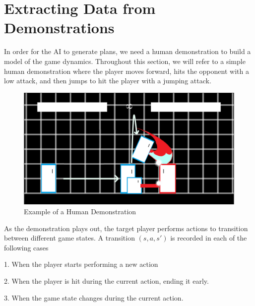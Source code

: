 \section{Extracting Data from Demonstrations}

In order for the AI to generate plans, we need a human demonstration to build a model of the game dynamics. Throughout this section, we will refer to a simple human demonstration where the player moves forward, hits the opponent with a low attack, and then jumps to hit the player with a jumping attack.

\begin{figure}[h]
	\centering
	\includegraphics[scale=0.5]{Figures/Demonstration.png}
	\caption{Example of a Human Demonstration}
	\label{ActionEffects}
\end{figure}

As the demonstration plays out, the target player performs actions to transition between different game states. A transition $(s,a,s')$ is recorded in each of the following cases

1. When the player starts performing a new action

2. When the player is hit during the current action, ending it early. 

3. When the game state changes during the current action.

